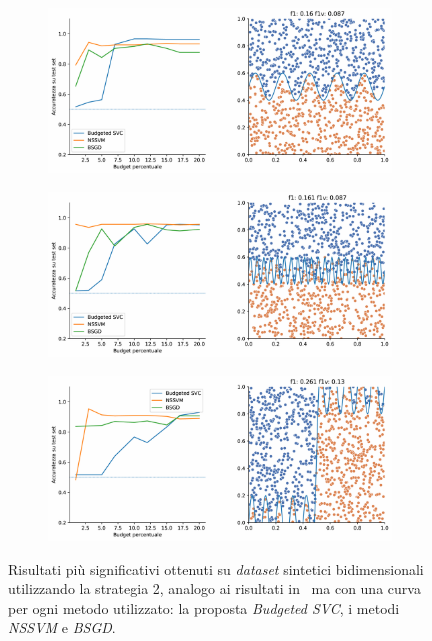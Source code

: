 \begin{figure}[ht]\ContinuedFloat
\centering
    \begin{subfigure}{.8\textwidth}
        \centering
        \includegraphics[width=\textwidth]{img/comp_new/12.pdf}
    \end{subfigure}
    \hfill
    \begin{subfigure}{.8\textwidth}
        \centering
        \includegraphics[width=\textwidth]{img/comp_new/14.pdf}
    \end{subfigure}
    \hfill
    \begin{subfigure}{.8\textwidth}
        \centering
        \includegraphics[width=\textwidth]{img/comp_new/15.pdf}
    \end{subfigure}
    \caption[]{Risultati più significativi ottenuti su \emph{dataset} sintetici bidimensionali utilizzando la strategia 2, analogo ai risultati in~ ma con una curva per ogni metodo utilizzato: la proposta \emph{Budgeted SVC}, i metodi \emph{NSSVM} e \emph{BSGD}.}
\label{fig:comp_new}
\end{figure}
